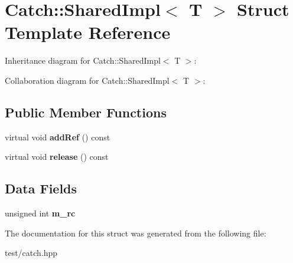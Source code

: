 \hypertarget{structCatch_1_1SharedImpl}{}\section{Catch\+:\+:Shared\+Impl$<$ T $>$ Struct Template Reference}
\label{structCatch_1_1SharedImpl}


Inheritance diagram for Catch\+:\+:Shared\+Impl$<$ T $>$\+:


Collaboration diagram for Catch\+:\+:Shared\+Impl$<$ T $>$\+:
\subsection*{Public Member Functions}
\begin{DoxyCompactItemize}
\item 
virtual void {\bfseries add\+Ref} () const \hypertarget{structCatch_1_1SharedImpl_a9b190b7a139a09d2624d1201d8e4f87e}{}\label{structCatch_1_1SharedImpl_a9b190b7a139a09d2624d1201d8e4f87e}

\item 
virtual void {\bfseries release} () const \hypertarget{structCatch_1_1SharedImpl_a16baad80ad5ad3dfaf2a10a157a02e01}{}\label{structCatch_1_1SharedImpl_a16baad80ad5ad3dfaf2a10a157a02e01}

\end{DoxyCompactItemize}
\subsection*{Data Fields}
\begin{DoxyCompactItemize}
\item 
unsigned int {\bfseries m\+\_\+rc}\hypertarget{structCatch_1_1SharedImpl_a7e71ef1985b85aa41a1632f932a96bcb}{}\label{structCatch_1_1SharedImpl_a7e71ef1985b85aa41a1632f932a96bcb}

\end{DoxyCompactItemize}


The documentation for this struct was generated from the following file\+:\begin{DoxyCompactItemize}
\item 
test/catch.\+hpp\end{DoxyCompactItemize}
